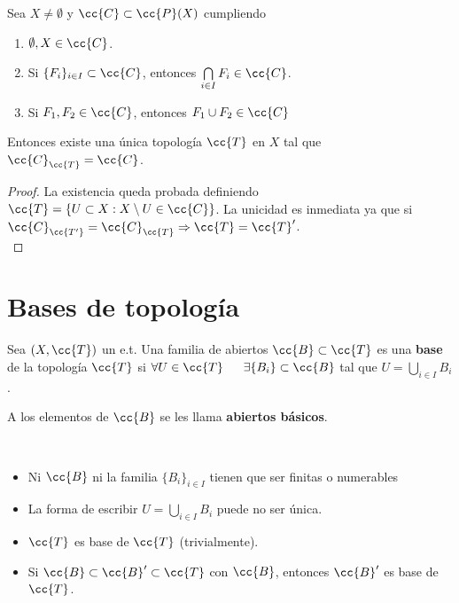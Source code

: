 \begin{teo}
    Sea $X\neq \emptyset$ y $\cc{C}\subset \cc{P}(X)$ cumpliendo
    \begin{enumerate}
        \item[\apuntar{C1}] $\emptyset, X \in \cc{C}$.
        \item[\apuntar{C2}] Si $\{F_i\}_{i\in I}\subset \cc{C}$, entonces $\bigcap\limits_{i\in I}F_i \in \cc{C}$.
        \item[\apuntar{C3}] Si $F_1, F_2 \in \cc{C}$, entonces $F_1 \cup F_2 \in \cc{C}$
    \end{enumerate}

    Entonces existe una única topología $\cc{T}$ en $X$ tal que $\cc{C}_{\cc{T}}=\cc{C}$.

    \begin{proof}
        La existencia queda probada definiendo $\cc{T}=\{U\subset X : X \setminus U \in \cc{C}\}$.
        La unicidad es inmediata ya que si $\cc{C}_{\cc{T'}}=\cc{C}_{\cc{T}}\Rightarrow \cc{T}=\cc{T}'$.\\
    \end{proof}
\end{teo}

\section{Bases de topología}

\begin{definicion}
    Sea $(X,\cc{T})$ un e.t. Una familia de abiertos $\cc{B}\subset \cc{T}$ es una \textbf{base} de la topología $\cc{T}$ si $\forall U \in \cc{T}$\ \ \ $\exists \{B_i\}\subset \cc{B}$ tal que $U=\bigcup\limits_{i\in I}B_i$.

    A los elementos de $\cc{B}$ se les llama \textbf{abiertos básicos}.
    \endsquare
\end{definicion}

\begin{observacion}\
    \begin{itemize}
        \item Ni $\cc{B}$ ni la familia $\{B_i\}_{i\in I}$ tienen que ser finitas o numerables
        \item La forma de escribir $U=\bigcup\limits_{i\in I} B_i$ puede no ser única.
        \item $\cc{T}$ es base de $\cc{T}$ (trivialmente).
        \item Si $\cc{B}\subset \cc{B}'\subset \cc{T}$ con $\cc{B}$, entonces $\cc{B}'$ es base de $\cc{T}$.
    \end{itemize}
    \endsquare
\end{observacion}

